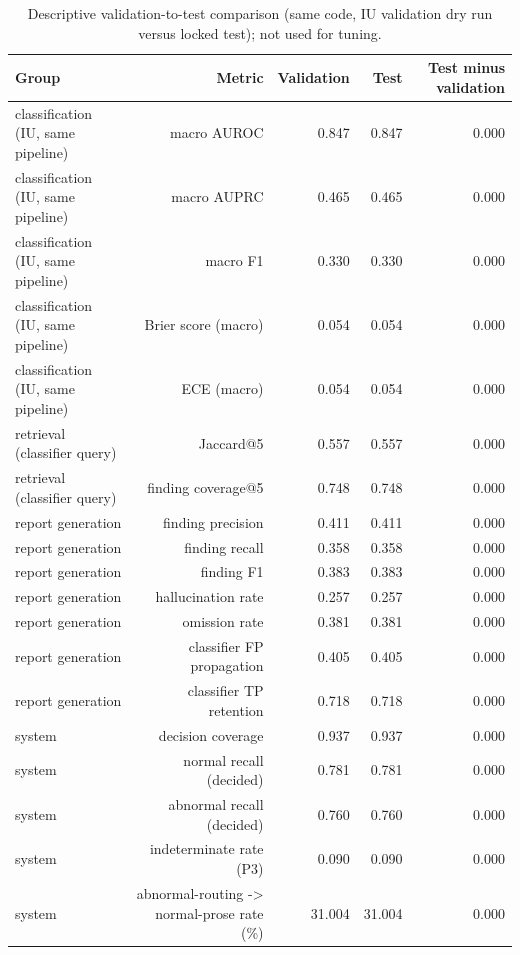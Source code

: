 \begin{table}[t]
\centering
\scriptsize
\begin{tabular}{lrrrr}
\hline
Group & Metric & Validation & Test & Test minus validation \\
\hline
classification (IU, same pipeline) & macro AUROC & 0.847 & 0.847 & 0.000 \\
classification (IU, same pipeline) & macro AUPRC & 0.465 & 0.465 & 0.000 \\
classification (IU, same pipeline) & macro F1 & 0.330 & 0.330 & 0.000 \\
classification (IU, same pipeline) & Brier score (macro) & 0.054 & 0.054 & 0.000 \\
classification (IU, same pipeline) & ECE (macro) & 0.054 & 0.054 & 0.000 \\
retrieval (classifier query) & Jaccard@5 & 0.557 & 0.557 & 0.000 \\
retrieval (classifier query) & finding coverage@5 & 0.748 & 0.748 & 0.000 \\
report generation & finding precision & 0.411 & 0.411 & 0.000 \\
report generation & finding recall & 0.358 & 0.358 & 0.000 \\
report generation & finding F1 & 0.383 & 0.383 & 0.000 \\
report generation & hallucination rate & 0.257 & 0.257 & 0.000 \\
report generation & omission rate & 0.381 & 0.381 & 0.000 \\
report generation & classifier FP propagation & 0.405 & 0.405 & 0.000 \\
report generation & classifier TP retention & 0.718 & 0.718 & 0.000 \\
system & decision coverage & 0.937 & 0.937 & 0.000 \\
system & normal recall (decided) & 0.781 & 0.781 & 0.000 \\
system & abnormal recall (decided) & 0.760 & 0.760 & 0.000 \\
system & indeterminate rate (P3) & 0.090 & 0.090 & 0.000 \\
system & abnormal-routing -> normal-prose rate (\%) & 31.004 & 31.004 & 0.000 \\
\hline
\end{tabular}
\caption{Descriptive validation-to-test comparison (same code, IU validation dry run versus locked test); not used for tuning.}
\label{tab:table8_validation_to_test_comparison}
\end{table}
